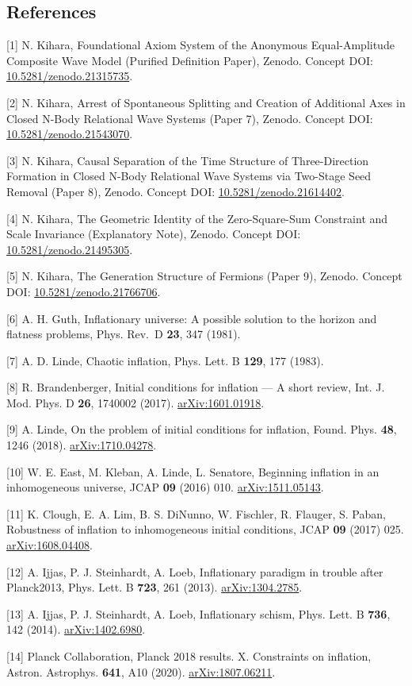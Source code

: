 \documentclass[
  a4paper,
]{article}
\begin{document}
\subsection{References}\label{references}

{[}1{]} N. Kihara, Foundational Axiom System of the Anonymous
Equal-Amplitude Composite Wave Model (Purified Definition Paper),
Zenodo. Concept DOI:
\href{https://doi.org/10.5281/zenodo.21315735}{10.5281/zenodo.21315735}.

{[}2{]} N. Kihara, Arrest of Spontaneous Splitting and Creation of
Additional Axes in Closed N-Body Relational Wave Systems (Paper 7),
Zenodo. Concept DOI:
\href{https://doi.org/10.5281/zenodo.21543070}{10.5281/zenodo.21543070}.

{[}3{]} N. Kihara, Causal Separation of the Time Structure of
Three-Direction Formation in Closed N-Body Relational Wave Systems via
Two-Stage Seed Removal (Paper 8), Zenodo. Concept DOI:
\href{https://doi.org/10.5281/zenodo.21614402}{10.5281/zenodo.21614402}.

{[}4{]} N. Kihara, The Geometric Identity of the Zero-Square-Sum
Constraint and Scale Invariance (Explanatory Note), Zenodo. Concept DOI:
\href{https://doi.org/10.5281/zenodo.21495305}{10.5281/zenodo.21495305}.

{[}5{]} N. Kihara, The Generation Structure of Fermions (Paper 9),
Zenodo. Concept DOI:
\href{https://doi.org/10.5281/zenodo.21766706}{10.5281/zenodo.21766706}.

{[}6{]} A. H. Guth, Inflationary universe: A possible solution to the
horizon and flatness problems, Phys. Rev.~D \textbf{23}, 347 (1981).

{[}7{]} A. D. Linde, Chaotic inflation, Phys. Lett. B \textbf{129}, 177
(1983).

{[}8{]} R. Brandenberger, Initial conditions for inflation --- A short
review, Int. J. Mod. Phys. D \textbf{26}, 1740002 (2017).
\href{https://arxiv.org/abs/1601.01918}{arXiv:1601.01918}.

{[}9{]} A. Linde, On the problem of initial conditions for inflation,
Found. Phys. \textbf{48}, 1246 (2018).
\href{https://arxiv.org/abs/1710.04278}{arXiv:1710.04278}.

{[}10{]} W. E. East, M. Kleban, A. Linde, L. Senatore, Beginning
inflation in an inhomogeneous universe, JCAP \textbf{09} (2016) 010.
\href{https://arxiv.org/abs/1511.05143}{arXiv:1511.05143}.

{[}11{]} K. Clough, E. A. Lim, B. S. DiNunno, W. Fischler, R. Flauger,
S. Paban, Robustness of inflation to inhomogeneous initial conditions,
JCAP \textbf{09} (2017) 025.
\href{https://arxiv.org/abs/1608.04408}{arXiv:1608.04408}.

{[}12{]} A. Ijjas, P. J. Steinhardt, A. Loeb, Inflationary paradigm in
trouble after Planck2013, Phys. Lett. B \textbf{723}, 261 (2013).
\href{https://arxiv.org/abs/1304.2785}{arXiv:1304.2785}.

{[}13{]} A. Ijjas, P. J. Steinhardt, A. Loeb, Inflationary schism, Phys.
Lett. B \textbf{736}, 142 (2014).
\href{https://arxiv.org/abs/1402.6980}{arXiv:1402.6980}.

{[}14{]} Planck Collaboration, Planck 2018 results. X. Constraints on
inflation, Astron. Astrophys. \textbf{641}, A10 (2020).
\href{https://arxiv.org/abs/1807.06211}{arXiv:1807.06211}.
\end{document}
